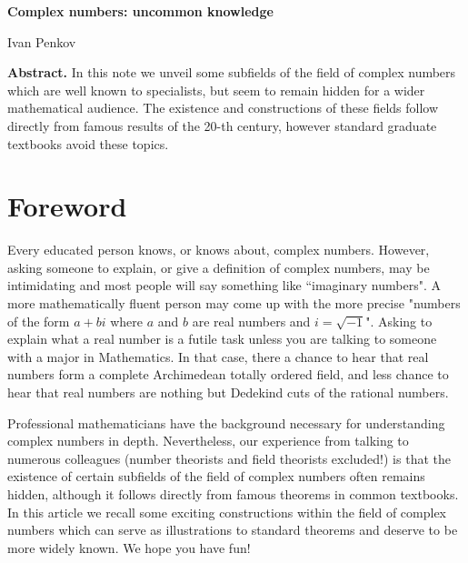 \documentclass[11pt]{article}
\theoremstyle{plain}
\theoremstyle{definition}
\theoremstyle{remark}
\begin{document}
\begin{center}
    \vspace*{2cm}
  
    {\LARGE\bfseries Complex numbers: uncommon knowledge\par}
    \vspace{1.5cm}
  
    {\LARGE Ivan Penkov\par}
    \vspace{2.5cm}
  
\end{center}

    \noindent
    {\small\textbf{Abstract.} In this note we unveil some subfields of the field of complex numbers which are well known to specialists, but seem to remain hidden for a wider mathematical audience. The existence and constructions of these fields follow directly from famous results of the 20-th century, however standard graduate textbooks avoid these topics.\par}
    \vspace{0.5cm}

\section{Foreword}
Every educated person knows, or knows about, complex numbers. However, asking someone to explain, or give a definition of complex numbers, may be intimidating and most people will say something like ``imaginary numbers". A more mathematically fluent person may come up with the more precise "numbers of the form $a + bi$ where $a$ and $b$ are real numbers and $i = \sqrt{-1}$". Asking to explain what a real number is a futile task unless you are talking to someone with a major in Mathematics. In that case, there a chance to hear that real numbers form a complete Archimedean totally ordered field, and less chance to hear that real numbers are nothing but Dedekind cuts of the rational numbers.
\par
Professional mathematicians have the background necessary for understanding complex numbers in depth. Nevertheless, our experience from talking to numerous colleagues (number theorists and field theorists excluded!) is that the existence of certain subfields of the field of complex numbers often remains hidden, although it follows directly from famous theorems in common textbooks. In this article we recall some exciting constructions within the field of complex numbers which can serve as illustrations to standard theorems and deserve to be more widely known. We hope you have fun!
\end{document}
